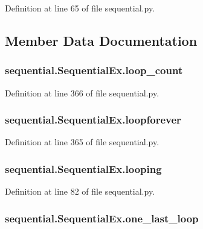 Definition at line 65 of file sequential.\-py.



\subsection{Member Data Documentation}
\hypertarget{classsequential_1_1SequentialEx_a4ba41b6f01a147966df8df335d570d22}{
\subsubsection[{loop\-\_\-count}]{\setlength{\rightskip}{0pt plus 5cm}sequential.\-Sequential\-Ex.\-loop\-\_\-count}}\label{classsequential_1_1SequentialEx_a4ba41b6f01a147966df8df335d570d22}


Definition at line 366 of file sequential.\-py.

\hypertarget{classsequential_1_1SequentialEx_a8cf719781ed7aa81bb27e30d4281cb66}{
\subsubsection[{loopforever}]{\setlength{\rightskip}{0pt plus 5cm}sequential.\-Sequential\-Ex.\-loopforever}}\label{classsequential_1_1SequentialEx_a8cf719781ed7aa81bb27e30d4281cb66}


Definition at line 365 of file sequential.\-py.

\hypertarget{classsequential_1_1SequentialEx_a548a626b1a098a7ad2e0709fc97fa8f7}{
\subsubsection[{looping}]{\setlength{\rightskip}{0pt plus 5cm}sequential.\-Sequential\-Ex.\-looping}}\label{classsequential_1_1SequentialEx_a548a626b1a098a7ad2e0709fc97fa8f7}


Definition at line 82 of file sequential.\-py.

\hypertarget{classsequential_1_1SequentialEx_a3dbe6e22b44436f3fef2c114550ad8ca}{
\subsubsection[{one\-\_\-last\-\_\-loop}]{\setlength{\rightskip}{0pt plus 5cm}sequential.\-Sequential\-Ex.\-one\-\_\-last\-\_\-loop}}\label{classsequential_1_1SequentialEx_a3dbe6e22b44436f3fef2c114550ad8ca}


